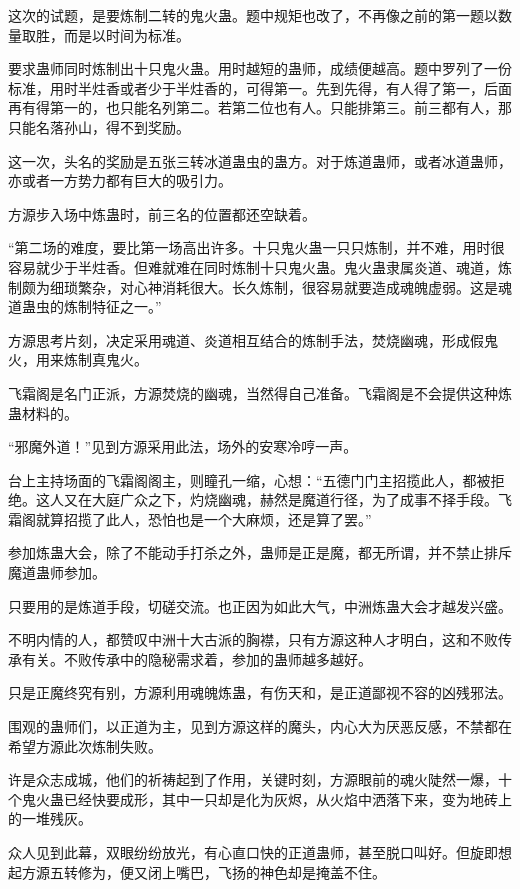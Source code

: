 \begin{this_body}
这次的试题，是要炼制二转的鬼火蛊。题中规矩也改了，不再像之前的第一题以数量取胜，而是以时间为标准。

要求蛊师同时炼制出十只鬼火蛊。用时越短的蛊师，成绩便越高。题中罗列了一份标准，用时半炷香或者少于半炷香的，可得第一。先到先得，有人得了第一，后面再有得第一的，也只能名列第二。若第二位也有人。只能排第三。前三都有人，那只能名落孙山，得不到奖励。

这一次，头名的奖励是五张三转冰道蛊虫的蛊方。对于炼道蛊师，或者冰道蛊师，亦或者一方势力都有巨大的吸引力。

方源步入场中炼蛊时，前三名的位置都还空缺着。

“第二场的难度，要比第一场高出许多。十只鬼火蛊一只只炼制，并不难，用时很容易就少于半炷香。但难就难在同时炼制十只鬼火蛊。鬼火蛊隶属炎道、魂道，炼制颇为细琐繁杂，对心神消耗很大。长久炼制，很容易就要造成魂魄虚弱。这是魂道蛊虫的炼制特征之一。”

方源思考片刻，决定采用魂道、炎道相互结合的炼制手法，焚烧幽魂，形成假鬼火，用来炼制真鬼火。

飞霜阁是名门正派，方源焚烧的幽魂，当然得自己准备。飞霜阁是不会提供这种炼蛊材料的。

“邪魔外道！”见到方源采用此法，场外的安寒冷哼一声。

台上主持场面的飞霜阁阁主，则瞳孔一缩，心想：“五德门门主招揽此人，都被拒绝。这人又在大庭广众之下，灼烧幽魂，赫然是魔道行径，为了成事不择手段。飞霜阁就算招揽了此人，恐怕也是一个大麻烦，还是算了罢。”

参加炼蛊大会，除了不能动手打杀之外，蛊师是正是魔，都无所谓，并不禁止排斥魔道蛊师参加。

只要用的是炼道手段，切磋交流。也正因为如此大气，中洲炼蛊大会才越发兴盛。

不明内情的人，都赞叹中洲十大古派的胸襟，只有方源这种人才明白，这和不败传承有关。不败传承中的隐秘需求着，参加的蛊师越多越好。

只是正魔终究有别，方源利用魂魄炼蛊，有伤天和，是正道鄙视不容的凶残邪法。

围观的蛊师们，以正道为主，见到方源这样的魔头，内心大为厌恶反感，不禁都在希望方源此次炼制失败。

许是众志成城，他们的祈祷起到了作用，关键时刻，方源眼前的魂火陡然一爆，十个鬼火蛊已经快要成形，其中一只却是化为灰烬，从火焰中洒落下来，变为地砖上的一堆残灰。

众人见到此幕，双眼纷纷放光，有心直口快的正道蛊师，甚至脱口叫好。但旋即想起方源五转修为，便又闭上嘴巴，飞扬的神色却是掩盖不住。


\end{this_body}
